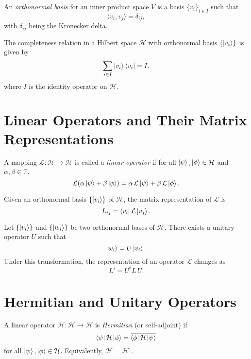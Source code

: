	\begin{definition}
		An \emph{orthonormal basis} for an inner product space \( V \) is a basis \( \{v_i\}_{i \in I} \) such that
		\[
		\langle v_i, v_j \rangle = \delta_{ij},
		\]
		with \( \delta_{ij} \) being the Kronecker delta.
	\end{definition}
	
	The completeness relation in a Hilbert space \( \mathcal{H} \) with orthonormal basis \( \{ \left| v_i \right\rangle \} \) is given by
	\[
	\sum_{i\in I} \left| v_i \right\rangle\left\langle v_i \right| = I,
	\]
	where \( I \) is the identity operator on \( \mathcal{H} \).
	
	\section{Linear Operators and Their Matrix Representations}
	\begin{definition}
		A mapping \( \mathcal{L}: \mathcal{H} \to \mathcal{H} \) is called a \emph{linear operator} if for all \( \left| \psi \right\rangle, \left| \phi \right\rangle \in \mathcal{H} \) and \( \alpha,\beta \in \mathbb{F} \),
		\[
		\mathcal{L}(\alpha \left| \psi \right\rangle + \beta \left| \phi \right\rangle) = \alpha\,\mathcal{L}\left| \psi \right\rangle + \beta\,\mathcal{L}\left| \phi \right\rangle.
		\]
	\end{definition}
	
	Given an orthonormal basis \( \{ \left| v_i \right\rangle \} \) of \( \mathcal{H} \), the matrix representation of \( \mathcal{L} \) is
	\[
	L_{ij} = \left\langle v_i \right|\mathcal{L}\left| v_j \right\rangle.
	\]
	
	\begin{definition}
		Let \( \{ \left| v_i \right\rangle \} \) and \( \{ \left| w_i \right\rangle \} \) be two orthonormal bases of \( \mathcal{H} \). There exists a unitary operator \( U \) such that
		\[
		\left| w_i \right\rangle = U\left| v_i \right\rangle.
		\]
		Under this transformation, the representation of an operator \( \mathcal{L} \) changes as
		\[
		L' = U^\dagger L\,U.
		\]
	\end{definition}
	
	\section{Hermitian and Unitary Operators}
	\begin{definition}
		A linear operator \( \mathcal{H}:\mathcal{H}\to\mathcal{H} \) is \emph{Hermitian} (or self-adjoint) if
		\[
		\left\langle \psi \right|\mathcal{H}\left| \phi \right\rangle = \overline{\left\langle \phi \right|\mathcal{H}\left| \psi \right\rangle}
		\]
		for all \( \left| \psi \right\rangle, \left| \phi \right\rangle\in\mathcal{H} \). Equivalently, \( \mathcal{H} = \mathcal{H}^\dagger \).
	\end{definition}
	
